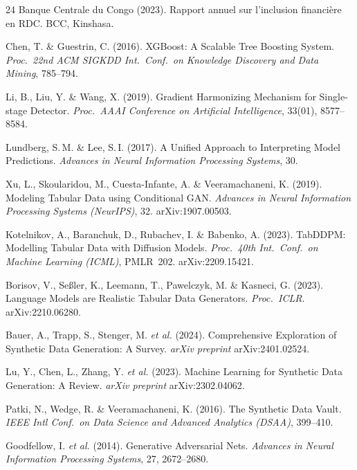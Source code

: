 \documentclass[12pt, a4paper, twocolumn]{article}
\begin{document}
\begin{thebibliography}{24}
Banque Centrale du Congo (2023).
\newblock Rapport annuel sur l'inclusion financière en RDC.
\newblock BCC, Kinshasa.

Chen, T. \& Guestrin, C. (2016).
\newblock XGBoost: A Scalable Tree Boosting System.
\newblock \textit{Proc.\ 22nd ACM SIGKDD Int.\ Conf.\ on Knowledge Discovery and Data Mining}, 785--794.

Li, B., Liu, Y. \& Wang, X. (2019).
\newblock Gradient Harmonizing Mechanism for Single-stage Detector.
\newblock \textit{Proc.\ AAAI Conference on Artificial Intelligence}, 33(01), 8577--8584.

Lundberg, S.\,M. \& Lee, S.\,I. (2017).
\newblock A Unified Approach to Interpreting Model Predictions.
\newblock \textit{Advances in Neural Information Processing Systems}, 30.

Xu, L., Skoularidou, M., Cuesta-Infante, A. \& Veeramachaneni, K. (2019).
\newblock Modeling Tabular Data using Conditional GAN.
\newblock \textit{Advances in Neural Information Processing Systems (NeurIPS)}, 32.
\newblock arXiv:1907.00503.

Kotelnikov, A., Baranchuk, D., Rubachev, I. \& Babenko, A. (2023).
\newblock TabDDPM: Modelling Tabular Data with Diffusion Models.
\newblock \textit{Proc.\ 40th Int.\ Conf.\ on Machine Learning (ICML)}, PMLR~202.
\newblock arXiv:2209.15421.

Borisov, V., Se\ss ler, K., Leemann, T., Pawelczyk, M. \& Kasneci, G. (2023).
\newblock Language Models are Realistic Tabular Data Generators.
\newblock \textit{Proc.\ ICLR}.
\newblock arXiv:2210.06280.

Bauer, A., Trapp, S., Stenger, M. \textit{et al.} (2024).
\newblock Comprehensive Exploration of Synthetic Data Generation: A Survey.
\newblock \textit{arXiv preprint} arXiv:2401.02524.

Lu, Y., Chen, L., Zhang, Y. \textit{et al.} (2023).
\newblock Machine Learning for Synthetic Data Generation: A Review.
\newblock \textit{arXiv preprint} arXiv:2302.04062.

Patki, N., Wedge, R. \& Veeramachaneni, K. (2016).
\newblock The Synthetic Data Vault.
\newblock \textit{IEEE Intl Conf.\ on Data Science and Advanced Analytics (DSAA)}, 399--410.

Goodfellow, I. \textit{et al.} (2014).
\newblock Generative Adversarial Nets.
\newblock \textit{Advances in Neural Information Processing Systems}, 27, 2672--2680.


\end{thebibliography}
\end{document}
